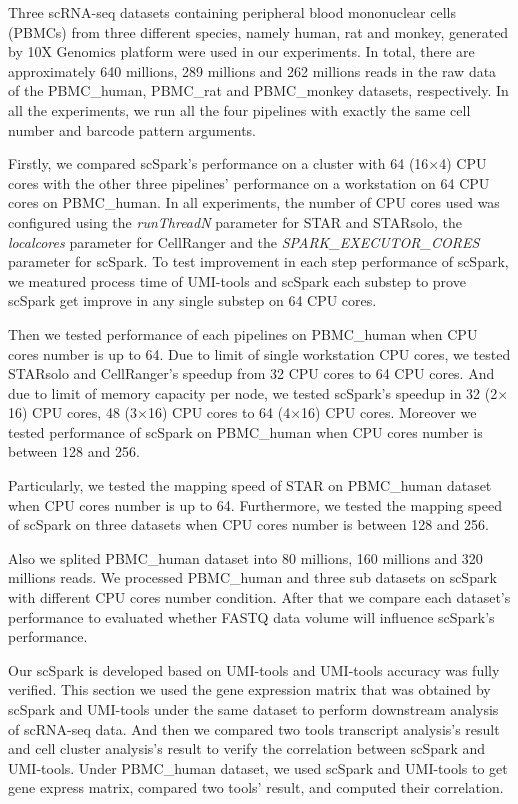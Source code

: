 \documentclass[conference]{IEEEtran}
\begin{document}
Three scRNA-seq datasets containing peripheral blood mononuclear cells (PBMCs) from three different species, namely human, rat and monkey, generated by 10X Genomics platform were used in our experiments. 
In total, there are approximately 640 millions, 289 millions and 262 millions reads in the raw data of the PBMC\_human, PBMC\_rat and PBMC\_monkey datasets, respectively. 
In all the experiments, we run all the four pipelines with exactly the same cell number and barcode pattern arguments.

Firstly, we compared scSpark's performance on a cluster with 64 (16$\times$4) CPU cores with the other three pipelines' performance on a workstation on 64 CPU cores on PBMC\_human.
In all experiments, the number of CPU cores used was configured using the \textit{runThreadN} parameter for STAR and STARsolo, the \textit{localcores} parameter for CellRanger and the \textit{SPARK\_EXECUTOR\_CORES} parameter for scSpark. 
To test improvement in each step performance of scSpark, we meatured process time of UMI-tools and scSpark each substep to prove scSpark get improve in any single substep on 64 CPU cores.

Then we tested performance of each pipelines on PBMC\_human when CPU cores number is up to 64.
Due to limit of single workstation CPU cores, we tested STARsolo and CellRanger's speedup from 32 CPU cores to 64 CPU cores.
And due to limit of memory capacity per node, we tested scSpark's speedup in 32 (2$\times$16) CPU cores, 48 (3$\times$16) CPU cores to 64 (4$\times$16) CPU cores.
Moreover we tested performance of scSpark on PBMC\_human when CPU cores number is between 128 and 256.

Particularly, we tested the mapping speed of STAR on PBMC\_human dataset when CPU cores number is up to 64.
Furthermore, we tested the mapping speed of scSpark on three datasets when CPU cores number is between 128 and 256.

Also we splited PBMC\_human dataset into 80 millions, 160 millions and 320 millions reads.
We processed PBMC\_human and three sub datasets on scSpark with different CPU cores number condition.
After that we compare each dataset's performance to evaluated whether FASTQ data volume will influence scSpark's performance.

Our scSpark is developed based on UMI-tools and UMI-tools accuracy was fully verified. 
This section we used the gene expression matrix that was obtained by scSpark and UMI-tools under the same dataset to perform downstream analysis of scRNA-seq data. 
And then we compared two tools transcript analysis's result and cell cluster analysis's result to verify the correlation between scSpark and UMI-tools. 
Under PBMC\_human dataset, we used scSpark and UMI-tools to get gene express matrix, compared two tools' result, and computed their correlation.
\end{document}
